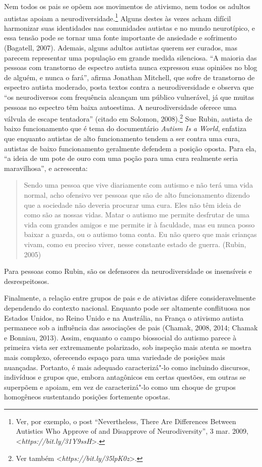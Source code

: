 Nem todos os pais se opõem aos movimentos de ativismo, nem todos os
adultos autistas apoiam a neurodiversidade.\footnote[15]{Ver, por exemplo, o post ``Nevertheless, There Are Differences
Between Autistics Who Approve of and Disapprove of Neurodiversity'', 3
mar. 2009,
\textless{}\emph{https://bit.ly/31Y9ssH}\textgreater{}.} Alguns
destes às vezes acham difícil harmonizar suas identidades nas
comunidades autistas e no mundo neurotípico, e essa tensão pode se
tornar uma fonte importante de ansiedade e sofrimento (Bagatell, 2007).
Ademais, alguns adultos autistas querem ser curados, mas parecem
representar uma população em grande medida silenciosa. ``A maioria das
pessoas com transtorno de espectro autista nunca expressou suas opiniões
no blog de alguém, e nunca o fará'', afirma Jonathan Mitchell, que sofre
de transtorno de espectro autista moderado, posta textos contra a
neurodiversidade e observa que ``os neurodiversos com frequência
alcançam um público vulnerável, já que muitas pessoas no espectro têm
baixa autoestima. A neurodiversidade oferece uma válvula de escape
tentadora'' (citado em Solomon, 2008).\footnote[16]{Ver também \textless{}\emph{https://bit.ly/35lpK0z}\textgreater{}.} Sue Rubin,
autista de baixo funcionamento que é tema do documentário
\emph{Autism Is a World}, enfatiza que enquanto autistas de alto
funcionamento tendem a ser contra uma cura, autistas de baixo
funcionamento geralmente defendem a posição oposta. Para ela, ``a ideia
de um pote de ouro com uma poção para uma cura realmente seria
maravilhosa'', e acrescenta:

\begin{quote}
Sendo uma pessoa que vive diariamente com autismo e não terá uma vida
normal, acho ofensivo ver pessoas que são de alto funcionamento dizendo
que a sociedade não deveria procurar uma cura. Eles não têm ideia de
como são as nossas vidas. Matar o autismo me permite desfrutar de uma
vida com grandes amigos e me permite ir à faculdade, mas eu nunca posso
baixar a guarda, ou o autismo toma conta. Eu não quero que mais crianças
vivam, como eu preciso viver, nesse constante estado de guerra. (Rubin, 2005)
\end{quote}

Para pessoas como Rubin, são os defensores da neurodiversidade os
insensíveis e desrespeitosos.

Finalmente, a relação entre grupos de pais e de ativistas difere
consideravelmente dependendo do contexto nacional. Enquanto pode ser
altamente conflituosa nos Estados Unidos, no Reino Unido e na Austrália,
na França o ativismo autista permanece sob a influência das associações
de pais (Chamak, 2008, 2014; Chamak e Bonniau, 2013). Assim, enquanto o
campo biossocial do autismo parece à primeira vista ser extremamente
polarizado, sob inspeção mais atenta se mostra mais complexo, oferecendo
espaço para uma variedade de posições mais nuançadas. Portanto, é mais
adequado caracterizá"-lo como incluindo discursos, indivíduos e grupos
que, embora antagônicos em certas questões, em outras se superpõem e
apoiam, em vez de caracterizá"-lo como um choque de grupos homogêneos
sustentando posições fortemente opostas.

